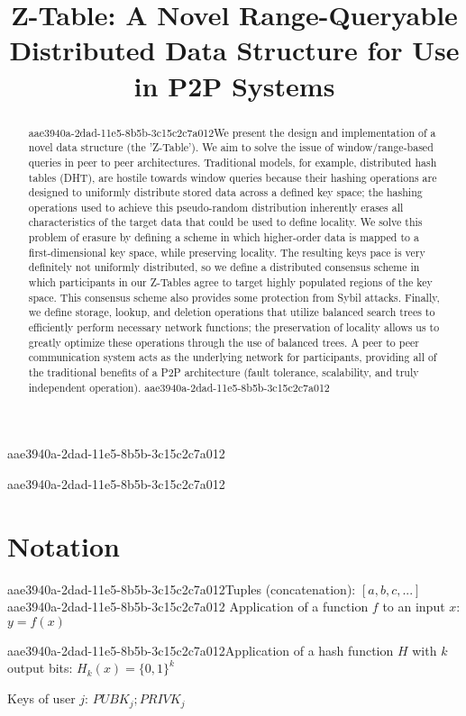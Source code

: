 \documentclass[12pt]{article}
\title{Z-Table: A Novel Range-Queryable Distributed Data Structure for Use in P2P Systems}
\begin{document}
aae3940a-2dad-11e5-8b5b-3c15c2c7a012
\maketitle

\begin{abstract}
aae3940a-2dad-11e5-8b5b-3c15c2c7a012We present the design and implementation of a novel data structure (the 'Z-Table'). We aim to solve the issue of window/range-based queries in peer to peer architectures. Traditional models, for example,  distributed hash tables (DHT), are hostile towards window queries because their hashing operations are designed to uniformly distribute stored data across a defined key space; the hashing operations used to achieve this pseudo-random distribution inherently erases all characteristics of the target data that could be used to define locality. We solve this problem of erasure by defining a scheme in which higher-order data is mapped to a first-dimensional key space, while preserving locality. The resulting keys pace is very definitely not uniformly distributed, so we define a distributed consensus scheme in which participants in our Z-Tables agree to target highly populated regions of the key space. This consensus scheme also provides some protection from Sybil attacks. Finally, we define storage, lookup, and deletion operations that utilize balanced search trees to efficiently perform necessary network functions; the preservation of locality allows us to greatly optimize these operations through the use of balanced trees. A peer to peer communication system acts as the underlying network for participants, providing all of the traditional benefits of a P2P architecture (fault tolerance, scalability, and truly independent operation).
aae3940a-2dad-11e5-8b5b-3c15c2c7a012\end{abstract}

aae3940a-2dad-11e5-8b5b-3c15c2c7a012\section{Notation}

aae3940a-2dad-11e5-8b5b-3c15c2c7a012Tuples (concatenation): $[a,b,c,...]$
aae3940a-2dad-11e5-8b5b-3c15c2c7a012
Application of a function $f$ to an input $x$: $y=f(x)$

aae3940a-2dad-11e5-8b5b-3c15c2c7a012Application of a hash function $H$ with $k$ output bits: $H_{k}(x) = \{0,1\}^k$

Keys of user $j$: $ PUBK_j; PRIVK_j $
\end{document}
